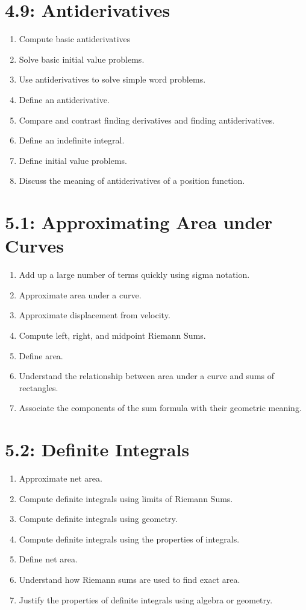 \documentclass[11pt]{article}
\begin{document}
\section*{4.9: Antiderivatives}
\begin{enumerate}
	\item Compute basic antiderivatives
	\item Solve basic initial value problems.
	\item Use antiderivatives to solve simple word problems.
	\item Define an antiderivative.
	\item Compare and contrast finding derivatives and finding antiderivatives.
	\item Define an indefinite integral.
	\item Define initial value problems.
	\item Discuss the meaning of antiderivatives of a position function.
\end{enumerate}

\section*{5.1: Approximating Area under Curves}
\begin{enumerate}
	\item Add up a large number of terms quickly using sigma notation.
	\item Approximate area under a curve.
	\item Approximate displacement from velocity.
	\item Compute left, right, and midpoint Riemann Sums.
	\item Define area.
	\item Understand the relationship between area under a curve and sums of rectangles.
	\item Associate the components of the sum formula with their geometric meaning.
\end{enumerate}

\section*{5.2: Definite Integrals}
\begin{enumerate}
	\item Approximate net area.
	\item Compute definite integrals using limits of Riemann Sums.
	\item Compute definite integrals using geometry.
	\item Compute definite integrals using the properties of integrals.
	\item Define net area.
	\item Understand how Riemann sums are used to find exact area.
	\item Justify the properties of definite integrals using algebra or geometry.
\end{enumerate}
\end{document}
